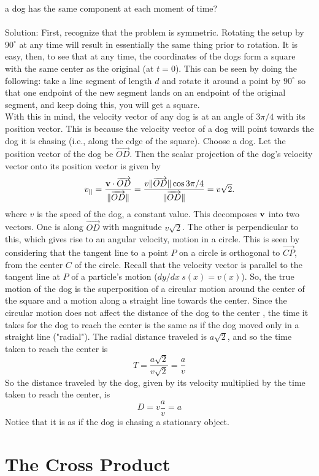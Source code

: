 \documentclass[12pt]{amsbook}
\begin{document}
a dog has the same component at each moment of time?
\\
\\
{\sc Solution}: First, recognize that the problem is symmetric. Rotating the setup by $90^\circ$ at any time will result in essentially the same thing prior to rotation. It is easy, then, to see that at any time, the coordinates of the dogs form a square with the same center as the original (at $t=0$).  This can be seen by doing the following: take a line segment of length $d$ and rotate it around a point by $90^\circ$ so that one endpoint of the new segment lands on an endpoint of the original segment, and keep doing this, you will get a square. 
\\
With this in mind, the velocity vector of any dog is at an angle of $3\pi/4$ with its position vector. This is because the velocity vector of a dog will point towards the dog it is chasing (i.e., along the edge of the square). Choose a dog. Let the position vector of the dog be $\overrightarrow{OD}$. Then the scalar projection of the dog's velocity vector onto its position vector is given by
$$v_{||}=\frac{{\bf v}\cdot\overrightarrow{OD}}{\|\overrightarrow{OD}\|}=\frac{v\|\overrightarrow{OD}\|\cos3\pi/4}{\|\overrightarrow{OD}\|}=v\sqrt{2}.$$
where $v$ is the speed of the dog, a constant value. This decomposes $\bf v$ into two vectors. One is along $\overrightarrow{OD}$ with magnitude $v\sqrt{2}$. The other is perpendicular to this, which gives rise to an angular velocity, motion in a circle. This is seen by considering that the tangent line to a point $P$ on a circle is orthogonal to $\overrightarrow{CP}$, from the center $C$ of the circle. Recall that the velocity vector is parallel to the tangent line at $P$ of a particle's motion ($dy/dx \ s(x)=v(x)$). So, the true motion of the dog is the superposition of a circular motion around the center of the square and a motion along a straight line towards the center. Since the circular motion does not affect the distance of the dog to the center , the time it takes for the dog to reach the center is the same as if the dog moved only in a straight line ("radial"). The radial distance traveled is $a\sqrt{2}$, and so the time taken to reach the center is
$$T=\frac{a\sqrt{2}}{v\sqrt{2}}=\frac{a}{v}$$
So the distance traveled by the dog, given by its velocity multiplied by the time taken to reach the center, is 
$$D=v\frac{a}{v}=a$$
Notice that it is as if the dog is chasing a stationary object. 
\newpage
\section{The Cross Product}
\end{document}
